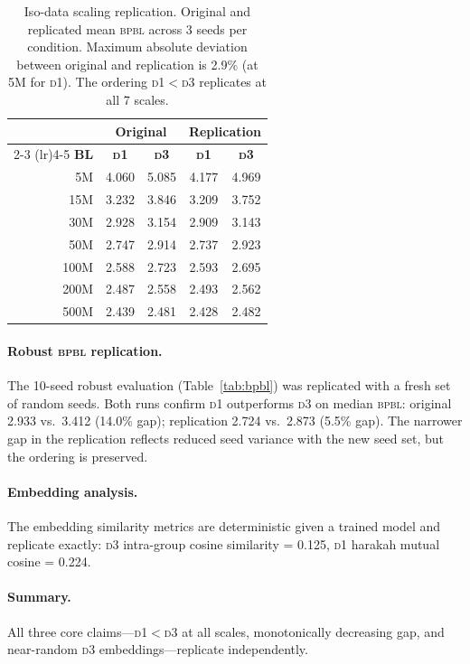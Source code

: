 \documentclass[11pt]{article}
\newcommand{\dOne}{\textsc{d1}}
\newcommand{\dThree}{\textsc{d3}}
\newcommand{\bpbl}{\textsc{bpbl}}
\begin{document}
\begin{table}[t]
\centering
\small
\begin{tabular}{@{}rcccc@{}}
\toprule
& \multicolumn{2}{c}{\textbf{Original}} & \multicolumn{2}{c}{\textbf{Replication}} \\
\cmidrule(lr){2-3} \cmidrule(lr){4-5}
\textbf{BL} & \textbf{\dOne{}} & \textbf{\dThree{}} & \textbf{\dOne{}} & \textbf{\dThree{}} \\
\midrule
5M   & 4.060 & 5.085 & 4.177 & 4.969 \\
15M  & 3.232 & 3.846 & 3.209 & 3.752 \\
30M  & 2.928 & 3.154 & 2.909 & 3.143 \\
50M  & 2.747 & 2.914 & 2.737 & 2.923 \\
100M & 2.588 & 2.723 & 2.593 & 2.695 \\
200M & 2.487 & 2.558 & 2.493 & 2.562 \\
500M & 2.439 & 2.481 & 2.428 & 2.482 \\
\bottomrule
\end{tabular}
\caption{Iso-data scaling replication. Original and replicated mean \bpbl{} across 3 seeds per condition. Maximum absolute deviation between original and replication is 2.9\% (at 5M for \dOne{}). The ordering \dOne{}$<$\dThree{} replicates at all 7 scales.}
\label{tab:repl_scaling}
\end{table}

\paragraph{Robust \bpbl{} replication.}
The 10-seed robust evaluation (Table~\ref{tab:bpbl}) was replicated with a fresh set of random seeds.
Both runs confirm \dOne{} outperforms \dThree{} on median \bpbl{}: original 2.933 vs.\ 3.412 (14.0\% gap); replication 2.724 vs.\ 2.873 (5.5\% gap).
The narrower gap in the replication reflects reduced seed variance with the new seed set, but the ordering is preserved.

\paragraph{Embedding analysis.}
The embedding similarity metrics are deterministic given a trained model and replicate exactly: \dThree{} intra-group cosine similarity = 0.125, \dOne{} harakah mutual cosine = 0.224.

\paragraph{Summary.}
All three core claims---\dOne{}$<$\dThree{} at all scales, monotonically decreasing gap, and near-random \dThree{} embeddings---replicate independently.
\end{document}
